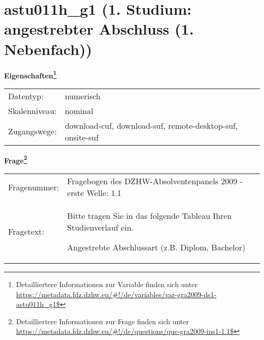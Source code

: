 
    \setcounter{footnote}{0}

    \vspace*{-1.8cm}
	\section{astu011h\_g1 (1. Studium: angestrebter Abschluss (1. Nebenfach))}
	\label{section:astu011h_g1}



    \vspace*{0.5cm}
    \noindent\textbf{Eigenschaften\footnote{Detailliertere Informationen zur Variable finden sich unter
		\url{https://metadata.fdz.dzhw.eu/\#!/de/variables/var-gra2009-ds1-astu011h_g1$}}}\\
	\begin{tabularx}{\hsize}{@{}lX}
	Datentyp: & numerisch \\
	Skalenniveau: & nominal \\
	Zugangswege: &
	  download-cuf, 
	  download-suf, 
	  remote-desktop-suf, 
	  onsite-suf
 \\
    \end{tabularx}



				\vspace*{0.5cm}
                \noindent\textbf{Frage\footnote{Detailliertere Informationen zur Frage finden sich unter
		              \url{https://metadata.fdz.dzhw.eu/\#!/de/questions/que-gra2009-ins1-1.1$}}}\\
				\begin{tabularx}{\hsize}{@{}lX}
					Fragenummer: &
					  Fragebogen des DZHW-Absolventenpanels 2009 - erste Welle:
					  1.1
 \\
					Fragetext: & Bitte tragen Sie in das folgende Tableau Ihren Studienverlauf ein.\par  Angestrebte Abschlussart (z.B. Diplom, Bachelor) \\
				\end{tabularx}





